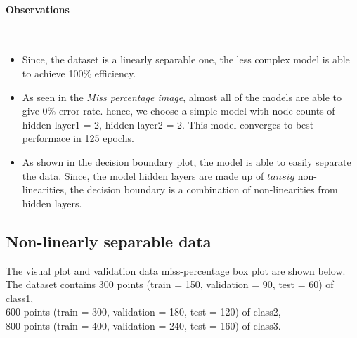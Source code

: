 \documentclass[fleqn]{article}
\newcommand{\myparagraph}[1]{\paragraph{#1}\mbox{}\\}
\begin{document}
\myparagraph{Observations}

\begin{itemize}
  \item Since, the dataset is a linearly separable one, the less complex model is able to achieve 100\% efficiency. 
  \item As seen in the \textit{Miss percentage image}, almost all of the models are able to give 0\% error rate. hence, we choose a simple model with node counts of hidden layer1 = 2, hidden layer2 = 2. This model converges to best performace in 125 epochs.
  \item As shown in the decision boundary plot, the model is able to easily separate the data. Since, the model hidden layers are made up of $tansig$ non-linearities, the decision boundary is a combination of non-linearities from hidden layers.   
\end{itemize}

\newpage
\subsection{Non-linearly separable data}
The visual plot and validation data miss-percentage box plot are shown below.\\
The dataset contains 300 points (train = 150, validation = 90, test = 60) of class1, \\ 
600 points (train = 300, validation = 180, test = 120) of class2, \\
800 points (train = 400, validation = 240, test = 160) of class3.\\
\end{document}
